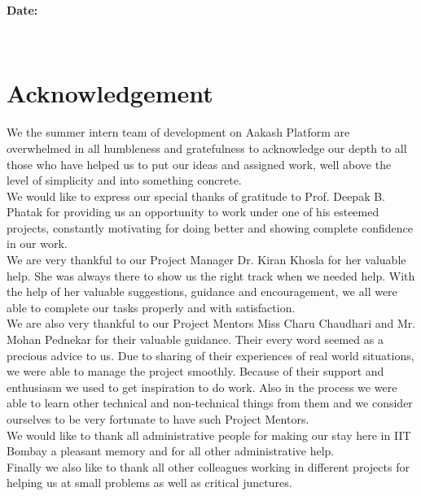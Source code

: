 \documentclass[12pt]{report}
\begin{document}
\begin{flushleft}
\textbf{Date:} \underline{\hspace{5cm}}
\end{flushleft}

 \pagebreak \thispagestyle{empty} \textcolor{white}{text} \pagebreak


\chapter*{Acknowledgement}
We the summer intern team of development on Aakash Platform are overwhelmed in all humbleness and gratefulness to acknowledge our depth to all those who have helped us to put our ideas and assigned work, well above the level of simplicity and into something concrete. \\

We would like to express our special thanks of gratitude to Prof. Deepak B. Phatak for providing us an opportunity to work under one of his esteemed projects, constantly motivating for doing better and showing complete confidence in our work. \\

We are very thankful to our Project Manager Dr. Kiran Khosla for her valuable help. She was always there to show us the right track when we needed help. With the help of her valuable suggestions, guidance and encouragement, we all were able to complete our tasks properly and with satisfaction. \\

We are also very thankful to our Project Mentors Miss Charu Chaudhari and Mr. Mohan Pednekar for their valuable guidance. Their every word seemed as a precious advice to us. Due to sharing of their experiences of real world situations, we were able to manage the project smoothly. Because of their support and enthusiasm we used to get inspiration to do work. Also in the process we were able to learn other technical and non-technical things from them and we consider ourselves to be very fortunate to have such Project Mentors. \\

We would like to thank all administrative people for making our stay here in IIT Bombay a pleasant memory and for all other administrative help.
\\
Finally we also like to thank all other colleagues working in different projects for helping us at small problems as well as critical junctures.
\\
\end{document}
